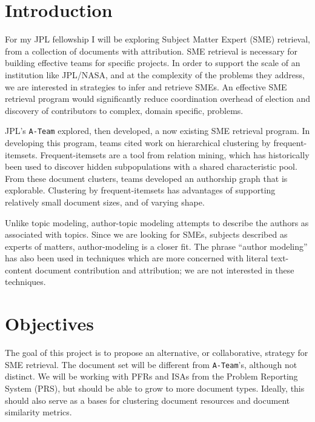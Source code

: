 \documentclass{article}
\begin{document}
\begin{multicols}{2}

\section{Introduction}

For my JPL fellowship I will be exploring Subject Matter Expert (SME) retrieval,
from a collection of documents with attribution. SME retrieval is necessary for
building effective teams for specific projects. In order to support the scale of an
institution like JPL/NASA, and at the complexity of the problems they address, we are
interested in strategies to infer and retrieve SMEs. An effective SME retrieval program
would significantly reduce coordination overhead of election and discovery of
contributors to complex, domain specific, problems.

JPL's \texttt{A-Team} explored, then developed, a now existing SME retrieval program.
In developing this program, teams cited work on hierarchical clustering by
frequent-itemsets\cite{wang2003,kiran2010}. Frequent-itemsets\cite{Agrawal1993} are a
tool from relation mining, which has historically been used to discover hidden
subpopulations with a shared characteristic pool. From these document clusters, teams
developed an authorship graph that is explorable. Clustering by frequent-itemsets has
advantages of supporting relatively small document sizes, and of varying shape.

Unlike topic modeling, author-topic modeling attempts to describe the authors as
associated with topics. Since we are looking for SMEs, subjects described as experts of
matters, author-modeling is a closer fit. The phrase ``author modeling'' has also been used
in techniques which are more concerned with literal text-content document
contribution and attribution\cite{Rexha2018}; we are not interested in these techniques.

\section{Objectives}

The goal of this project is to propose an alternative, or collaborative, strategy for
SME retrieval. The document set will be different from \texttt{A-Team}'s, although
not distinct. We will be working with PFRs and ISAs from the Problem Reporting System
(PRS), but should be able to grow to more document types. Ideally, this should also
serve as a bases for clustering document resources and document similarity metrics.


\end{multicols}
\end{document}
